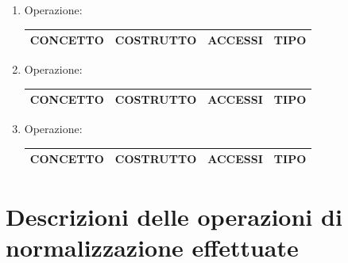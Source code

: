 \documentclass[a4paper, 10pt]{report}
\begin{document}
\begin{enumerate}
\item Operazione: \\
\begin{table}[h!]
\centering
\begin{tabular}{|l|l|l|l|}
\hline
\textbf{CONCETTO}&\textbf{COSTRUTTO}&\textbf{ACCESSI}&\textbf{TIPO}\\
\hline
\end{tabular}
\end{table}

\item Operazione: \\
\begin{table}[h!]
\centering
\begin{tabular}{|l|l|l|l|}
\hline
\textbf{CONCETTO}&\textbf{COSTRUTTO}&\textbf{ACCESSI}&\textbf{TIPO}\\
\hline
\end{tabular}
\end{table}

\item Operazione: \\
\begin{table}[h!]
\centering
\begin{tabular}{|l|l|l|l|}
\hline
\textbf{CONCETTO}&\textbf{COSTRUTTO}&\textbf{ACCESSI}&\textbf{TIPO}\\
\hline
\end{tabular}
\end{table}
\end{enumerate}

\chapter{Descrizioni delle operazioni di normalizzazione effettuate}
\end{document}
